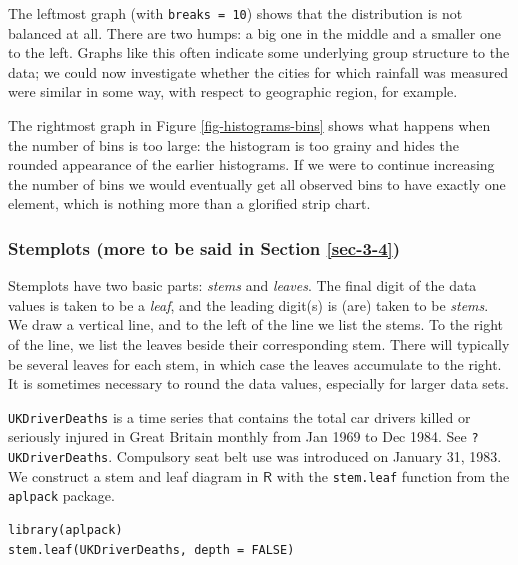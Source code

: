 \documentclass[captions=tableheading]{scrbook}
\begin{document}
\begin{example}
The leftmost graph (with \texttt{breaks = 10}) shows that the distribution is not balanced at all. There are two humps: a big one in the middle and a smaller one to the left. Graphs like this often indicate some underlying group structure to the data; we could now investigate whether the cities for which rainfall was measured were similar in some way, with respect to geographic region, for example.

The rightmost graph in Figure \ref{fig-histograms-bins} shows what happens when the number of bins is too large: the histogram is too grainy and hides the rounded appearance of the earlier histograms. If we were to continue increasing the number of bins we would eventually get all observed bins to have exactly one element, which is nothing more than a glorified strip chart.

\end{example}
\subsubsection{Stemplots (more to be said in Section \ref{sec-3-4})}
\label{sec-3-1-2-3}


Stemplots have two basic parts: \emph{stems} and \emph{leaves}. The final digit of the data values is taken to be a \emph{leaf}, and the leading digit(s) is (are) taken to be \emph{stems}. We draw a vertical line, and to the left of the line we list the stems. To the right of the line, we list the leaves beside their corresponding stem. There will typically be several leaves for each stem, in which case the leaves accumulate to the right. It is sometimes necessary to round the data values, especially for larger data sets.

\begin{example}
\texttt{UKDriverDeaths} is a time series that contains the total car drivers killed or seriously injured in Great Britain monthly from Jan 1969 to Dec 1984. See \texttt{?UKDriverDeaths}. Compulsory seat belt use was introduced on January 31, 1983. We construct a stem and leaf diagram in \(\mathsf{R}\) with the \texttt{stem.leaf} function from the \texttt{aplpack} package\cite{aplpack}.
\end{example}


\begin{verbatim}
library(aplpack)
stem.leaf(UKDriverDeaths, depth = FALSE)
\end{verbatim}
\end{document}
